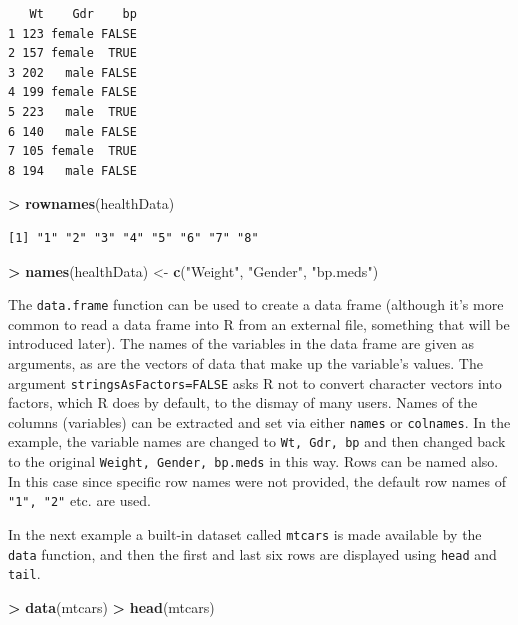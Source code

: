 \documentclass[]{krantz}
\makeatletter
\newenvironment{Shaded}{\begin{snugshade}}{\end{snugshade}}
\newcommand{\KeywordTok}[1]{\textcolor[rgb]{0.27,0.27,0.27}{\textbf{#1}}}
\newcommand{\NormalTok}[1]{#1}
\newcommand{\OperatorTok}[1]{\textcolor[rgb]{0.43,0.43,0.43}{\textbf{#1}}}
\newcommand{\StringTok}[1]{\textcolor[rgb]{0.5,0.5,0.5}{#1}}
\newenvironment{kframe}{%
\medskip{}
\setlength{\fboxsep}{.8em}
 \def\at@end@of@kframe{}%
 \ifinner\ifhmode%
  \def\at@end@of@kframe{\end{minipage}}%
  \begin{minipage}{\columnwidth}%
 \fi\fi%
 \def\FrameCommand##1{\hskip\@totalleftmargin \hskip-\fboxsep
 \colorbox{shadecolor}{##1}\hskip-\fboxsep
     \hskip-\linewidth \hskip-\@totalleftmargin \hskip\columnwidth}%
 \MakeFramed {\advance\hsize-\width
   \@totalleftmargin\z@ \linewidth\hsize
   \@setminipage}}%
 {\par\unskip\endMakeFramed%
 \at@end@of@kframe}
\renewenvironment{Shaded}{\begin{kframe}}{\end{kframe}}
\makeatother
\begin{document}
\begin{verbatim}
   Wt    Gdr    bp
1 123 female FALSE
2 157 female  TRUE
3 202   male FALSE
4 199 female FALSE
5 223   male  TRUE
6 140   male FALSE
7 105 female  TRUE
8 194   male FALSE
\end{verbatim}

\begin{Shaded}
\begin{Highlighting}[]
\OperatorTok{>}\StringTok{ }\KeywordTok{rownames}\NormalTok{(healthData)}
\end{Highlighting}
\end{Shaded}

\begin{verbatim}
[1] "1" "2" "3" "4" "5" "6" "7" "8"
\end{verbatim}

\begin{Shaded}
\begin{Highlighting}[]
\OperatorTok{>}\StringTok{ }\KeywordTok{names}\NormalTok{(healthData) <-}\StringTok{ }\KeywordTok{c}\NormalTok{(}\StringTok{"Weight"}\NormalTok{, }\StringTok{"Gender"}\NormalTok{, }\StringTok{"bp.meds"}\NormalTok{)}
\end{Highlighting}
\end{Shaded}

The \texttt{data.frame} function can be used to create a data frame (although it's more common to read a data frame into R from an external file, something that will be introduced later). The names of the variables in the data frame are given as arguments, as are the vectors of data that make up the variable's values. The argument \texttt{stringsAsFactors=FALSE} asks R not to convert character vectors into factors, which R does by default, to the dismay of many users. Names of the columns (variables) can be extracted and set via either \texttt{names} or \texttt{colnames}. In the example, the variable names are changed to \texttt{Wt,\ Gdr,\ bp} and then changed back to the original \texttt{Weight,\ Gender,\ bp.meds} in this way. Rows can be named also. In this case since specific row names were not provided, the default row names of \texttt{"1",\ "2"} etc. are used.

In the next example a built-in dataset called \texttt{mtcars} is made available by the \texttt{data} function, and then the first and last six rows are displayed using \texttt{head} and \texttt{tail}.

\begin{Shaded}
\begin{Highlighting}[]
\OperatorTok{>}\StringTok{ }\KeywordTok{data}\NormalTok{(mtcars)}
\OperatorTok{>}\StringTok{ }\KeywordTok{head}\NormalTok{(mtcars)}
\end{Highlighting}
\end{Shaded}
\end{document}
